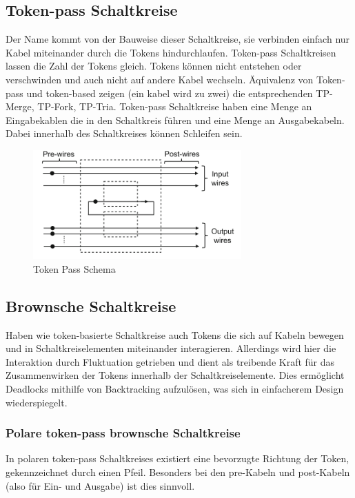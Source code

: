 \documentclass[11pt,a4paper]{article}
\begin{document}

\subsection{Token-pass Schaltkreise}
Der Name kommt von der Bauweise dieser Schaltkreise, sie verbinden einfach nur
Kabel miteinander durch die Tokens hindurchlaufen.
%
Token-pass Schaltkreisen lassen die Zahl der Tokens gleich.
%
Tokens können nicht entstehen oder verschwinden und auch 
nicht auf andere Kabel wechseln.
%
Äquivalenz von Token-pass und token-based zeigen (ein kabel wird zu zwei)
die entsprechenden TP-Merge, TP-Fork, TP-Tria.
%
Token-pass Schaltkreise haben eine Menge an Eingabekablen die in
den Schaltkreis führen und eine Menge an Ausgabekabeln.
%
Dabei innerhalb des Schaltkreises können Schleifen sein. 
%

\begin{figure}[h]
    \centering
    \includegraphics[width=8cm]{bilder/TokenPassScheme.png}
    \caption{Token Pass Schema}
    \label{fig:tokenPassScheme}
\end{figure} 


\subsection{Brownsche Schaltkreise}
Haben wie token-basierte Schaltkreise auch Tokens die sich auf Kabeln 
bewegen und in Schaltkreiselementen miteinander interagieren.
%
Allerdings wird hier die Interaktion durch Fluktuation getrieben und dient
als treibende Kraft für das Zusammenwirken der Tokens innerhalb der
Schaltkreiselemente. 
%
Dies ermöglicht Deadlocks mithilfe 
von Backtracking aufzulösen, was sich in einfacherem Design wiederspiegelt.


\subsubsection{Polare token-pass brownsche Schaltkreise}
In polaren token-pass Schaltkreises existiert eine bevorzugte Richtung
der Token, gekennzeichnet durch einen Pfeil.
%
Besonders bei den pre-Kabeln und post-Kabeln (also für Ein- und Ausgabe)
ist dies sinnvoll.
\end{document}

